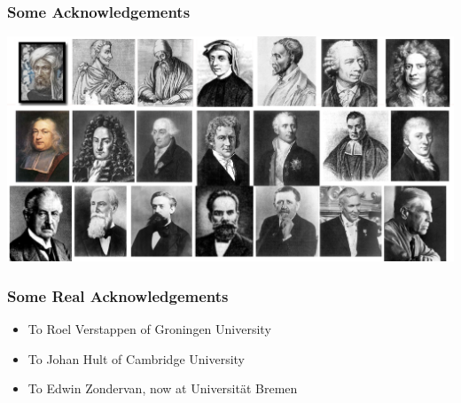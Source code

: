 \documentclass[11pt,table,final,fleqn,xcolor={usenames,dvipsnames},handout]{beamer}
\begin{document}
\begin{frame}
 \frametitle{Some Acknowledgements}
 \centering\includegraphics[width=\textwidth]{img/ack.png}
\end{frame}

\begin{frame}
 \frametitle{Some Real Acknowledgements}
 \begin{itemize}
  \item To Roel Verstappen of Groningen University
  \item To Johan Hult of Cambridge University
  \item To Edwin Zondervan, now at Universität Bremen
 \end{itemize}
\end{frame}
\end{document}
